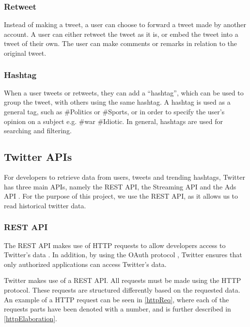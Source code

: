 \subsubsection{Retweet}
Instead of making a tweet, a user can choose to forward a tweet made by another
account. A user can either retweet the tweet as it is, or embed the tweet into a
tweet of their own. The user can make comments or remarks in relation to the
original tweet.

\subsubsection{Hashtag}
When a user tweets or retweets, they can add a ``hashtag'', which can be used to
group the tweet, with others using the same hashtag. A hashtag is used as a
general tag, such as \#Politics or \#Sports, or in order to specify the user's
opinion on a subject e.g. \#war \#Idiotic. In general, hashtags are used for
searching and filtering.

\subsection{Twitter \acp{API}}
For developers to retrieve data from users, tweets and trending hashtags,
Twitter has three main \acp{API}, namely the \ac{REST} \ac{API}, the Streaming
\ac{API} and the Ads \ac{API} \citep{TwitterDevDocs}. For the purpose of this
project, we use the \ac{REST} \ac{API}, as it allows us to read historical twitter
data.

\subsubsection{REST API}
The \ac{REST} \ac{API} makes use of \ac{HTTP} requests to allow developers access to
Twitter's data \citep{TwitterREST}. In addition, by using the OAuth protocol
\citep{TwitterOAuth}, Twitter ensures that only authorized applications can
access Twitter's data.\nl

Twitter makes use of a \ac{REST} \ac{API}. All requests must be made using the
\ac{HTTP} protocol. These requests are structured differently based on the
requested data. An example of a \ac{HTTP} request can be seen in
\autoref{httpReq}, where each of the requests parts have been denoted with a
number, and is further described in \autoref{httpElaboration}.



